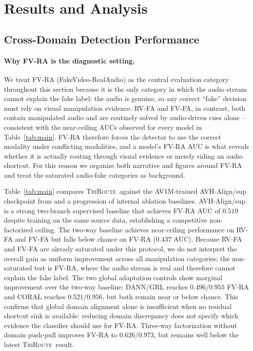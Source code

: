 \documentclass{article}
\newcommand{\method}{\textsc{TriRoute}}
\begin{document}
\section{Results and Analysis}

\subsection{Cross-Domain Detection Performance}

\paragraph{Why FV-RA is the diagnostic setting.}
We treat FV-RA (FakeVideo-RealAudio) as the central evaluation category throughout this section because it is the only category in which the audio stream cannot explain the fake label: the audio is genuine, so any correct ``fake'' decision must rely on visual manipulation evidence. RV-FA and FV-FA, in contrast, both contain manipulated audio and are routinely solved by audio-driven cues alone -- consistent with the near-ceiling AUCs observed for every model in Table~\ref{tab:main}. FV-RA therefore forces the detector to use the correct modality under conflicting modalities, and a model's FV-RA AUC is what reveals whether it is actually routing through visual evidence or merely riding an audio shortcut. For this reason we organize both narrative and figures around FV-RA and treat the saturated audio-fake categories as background.

Table~\ref{tab:main} compares \method\ against the AV1M-trained AVH-Align/sup checkpoint from \citet{smeu2025avhalign} and a progression of internal ablation baselines. AVH-Align/sup is a strong two-branch supervised baseline that achieves FV-RA AUC of $0.519$ despite training on the same source data, establishing a competitive non-factorized ceiling. The two-way baseline achieves near-ceiling performance on RV-FA and FV-FA but falls below chance on FV-RA ($0.437$ AUC). Because RV-FA and FV-FA are already saturated under this protocol, we do not interpret the overall gain as uniform improvement across all manipulation categories; the non-saturated test is FV-RA, where the audio stream is real and therefore cannot explain the fake label. The two global adaptation controls show marginal improvement over the two-way baseline: DANN/GRL reaches $0.496/0.955$ FV-RA and CORAL reaches $0.521/0.956$, but both remain near or below chance. This confirms that global domain alignment alone is insufficient when no residual shortcut sink is available: reducing domain discrepancy does not specify which evidence the classifier should use for FV-RA. Three-way factorization without domain push-pull improves FV-RA to $0.626/0.973$, but remains well below the latest \method\ result.
\end{document}
